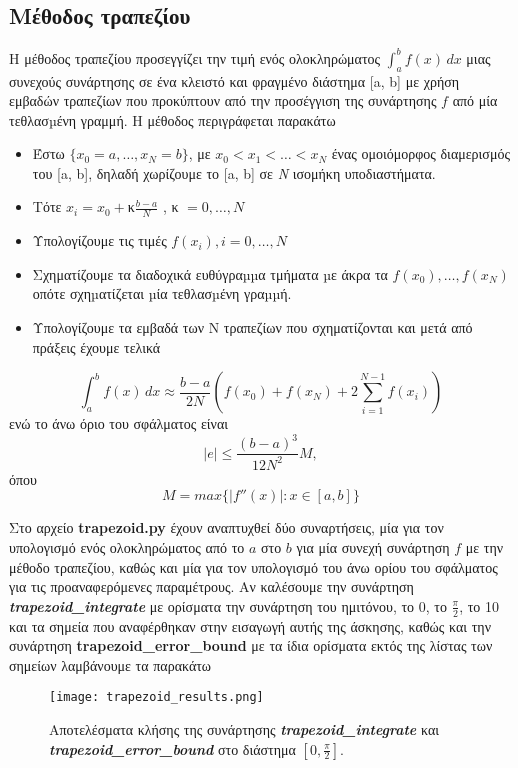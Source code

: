 \documentclass[Second Project.tex]{subfiles}
\begin{document}
\subsection{ Μέθοδος τραπεζίου }
Η μέθοδος τραπεζίου προσεγγίζει την τιμή ενός ολοκληρώματος $\int_{a}^{b} f(x) \,dx$ μιας συνεχούς
συνάρτησης σε ένα κλειστό και φραγμένο διάστημα \textlatin{[a, b]} με χρήση εμβαδών τραπεζίων που 
προκύπτουν από την προσέγγιση της συνάρτησης $f$ από μία τεθλασµένη γραμμή. Η μέθοδος περιγράφεται παρακάτω
\begin{itemize}
    \item Έστω $\{x_{0}=a,\dots,x_{N}=b\}$, με $x_{0}<x_{1}<\dots<x_{N}$ ένας ομοιόμορφος διαμερισμός του
    \textlatin{[a, b]}, δηλαδή χωρίζουμε το \textlatin{[a, b]} σε \textit{Ν} ισομήκη υποδιαστήματα.
    \item Τότε $x_{i} = x_{0} + $κ$\frac{b-a}{N}$ ,  κ $=0,\dots,N$
    \item Υπολογίζουμε τις τιμές $f(x_{i}), i = 0,\dots,N$
    \item Σχηματίζουμε τα διαδοχικά ευθύγραµµα τμήματα µε άκρα τα $f(x_{0}),\dots,f(x_{N})$
    οπότε σχηµατίζεται µία τεθλασµένη γραµµή. 
    \item Υπολογίζουμε τα εμβαδά των Ν τραπεζίων που σχηματίζονται και μετά από πράξεις έχουμε τελικά
\end{itemize} 
\begin{equation*}
    \int_{a}^{b} f(x) \,dx \approx \frac{b-a}{2N}(f(x_{0}) + f(x_{N}) + 2\sum_{i=1}^{N-1}f(x_{i}) )
\end{equation*}
ενώ το άνω όριο του σφάλματος είναι
\begin{equation*}
    |e| \leq \frac{(b-a)^{3}}{12N^{2}}M ,
\end{equation*}
όπου
\begin{equation*}
M = max\{|f''(x)|: x\in [a, b]\}
\end{equation*}

Στο αρχείο \textlatin{\textbf{trapezoid.py}} έχουν αναπτυχθεί δύο συναρτήσεις, μία για τον υπολογισμό ενός ολοκληρώματος
από το $a$ στο $b$ για μία συνεχή συνάρτηση $f$ με την μέθοδο τραπεζίου, καθώς και μία για τον υπολογισμό του άνω ορίου του 
σφάλματος για τις προαναφερόμενες παραμέτρους. Αν καλέσουμε την συνάρτηση \textit{\textlatin{\textbf{trapezoid\_integrate}}} 
με ορίσματα την συνάρτηση του ημιτόνου, το 0, το $\frac{\pi}{2}$, το 10 και τα σημεία που αναφέρθηκαν στην εισαγωγή αυτής της
άσκησης, καθώς και την συνάρτηση \textlatin{\textbf{\textbf{trapezoid\_error\_bound}}} με τα ίδια ορίσματα εκτός της
λίστας των σημείων λαμβάνουμε τα παρακάτω
\begin{figure}[h!]
    \centering
    \captionsetup{justification=centering}
    \begin{center}
    \texttt{[image: trapezoid\_results.png]}    
    \caption{ Αποτελέσματα κλήσης της συνάρτησης \textit{\textlatin{\textbf{trapezoid\_integrate}}} 
    και \textit{\textlatin{\textbf{trapezoid\_error\_bound}}} στο διάστημα $[0, \frac{\pi}{2}]$.}
    \end{center}
\end{figure}
\end{document}

